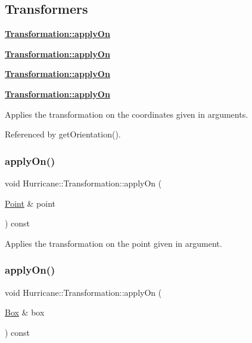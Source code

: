 \hypertarget{classHurricane_1_1Transformation_secTransformationTransformers}{}\subsection{Transformers}\label{classHurricane_1_1Transformation_secTransformationTransformers}
{\bfseries \hyperlink{classHurricane_1_1Transformation_ad37365bfd47851ca33519bb9a05b5402}{Transformation\+::apply\+On}}

{\bfseries \hyperlink{classHurricane_1_1Transformation_ad37365bfd47851ca33519bb9a05b5402}{Transformation\+::apply\+On}}

{\bfseries \hyperlink{classHurricane_1_1Transformation_ad37365bfd47851ca33519bb9a05b5402}{Transformation\+::apply\+On}}

{\bfseries \hyperlink{classHurricane_1_1Transformation_ad37365bfd47851ca33519bb9a05b5402}{Transformation\+::apply\+On}}

Applies the transformation on the coordinates given in arguments. 

Referenced by get\+Orientation().

\mbox{\label{classHurricane_1_1Transformation_ae73ca0f0e10d85267ef685d94eda9bcc}} 
\subsubsection{\texorpdfstring{apply\+On()}{applyOn()}\hspace{0.1cm}{\footnotesize\ttfamily [2/4]}}
{\footnotesize\ttfamily void Hurricane\+::\+Transformation\+::apply\+On (\begin{DoxyParamCaption}\item[{\hyperlink{classHurricane_1_1Point}{Point} \&}]{point }\end{DoxyParamCaption}) const}

Applies the transformation on the point given in argument. \mbox{\label{classHurricane_1_1Transformation_aa3ab2731934330107a3f2a3079f21132}} 
\subsubsection{\texorpdfstring{apply\+On()}{applyOn()}\hspace{0.1cm}{\footnotesize\ttfamily [3/4]}}
{\footnotesize\ttfamily void Hurricane\+::\+Transformation\+::apply\+On (\begin{DoxyParamCaption}\item[{\hyperlink{classHurricane_1_1Box}{Box} \&}]{box }\end{DoxyParamCaption}) const}

